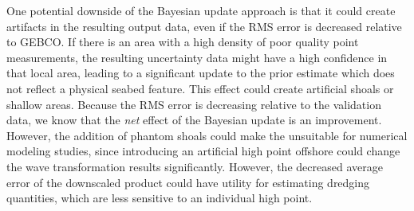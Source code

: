 One potential downside of the Bayesian update approach is that it could create artifacts in the resulting output data, even if the RMS error is decreased relative to GEBCO. If there is an area with a high density of poor quality point measurements, the resulting uncertainty data might have a high confidence in that local area, leading to a significant update to the prior estimate which does not reflect a physical seabed  feature. This effect could create artificial shoals or shallow areas.  Because the RMS error is decreasing relative to the validation data, we know that the \emph{net} effect of the Bayesian update is an improvement. However, the addition of phantom shoals could make the unsuitable for numerical modeling studies, since introducing an artificial high point offshore could change the wave transformation results significantly. However, the decreased average error of the downscaled product could have utility for estimating dredging quantities, which are less sensitive to an individual high point. 